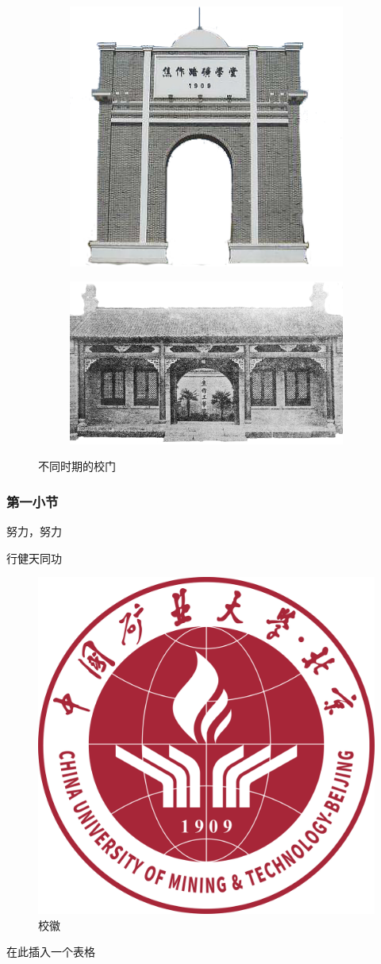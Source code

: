 \documentclass[UTF8,AutoFakeBold=1.3,fixskip = true]{ctexart}
\numberwithin{figure}{section}
\numberwithin{table}{section}
\numberwithin{equation}{section}
\begin{document}
		\begin{figure}[h!]
			\begin{subfigure}[b]{.5\linewidth}
				\centering
				\includegraphics[width=0.5\linewidth]{../pic/lkxt.png}
				\label{fig:1a3}
			\end{subfigure}
			\hfill
			\begin{subfigure}[b]{.5\linewidth}
				\centering
				\includegraphics[width=0.7\linewidth]{../pic/jg.png}
				\label{fig:1b3}
			\end{subfigure}
			\caption{不同时期的校门}
			\label{fig:gate3}
			\end{figure}
			

		\subsubsection{第一小节}
		\par 努力，努力
		\par 行健天同功
			\begin{figure}[htbp]
				\centering
				\includegraphics[width=0.3\linewidth]{../pic/badge.png}
				\caption{校徽}
				\label{fig:badge3}
			\end{figure}
		\par 在此插入一个表格
		
\end{document}
